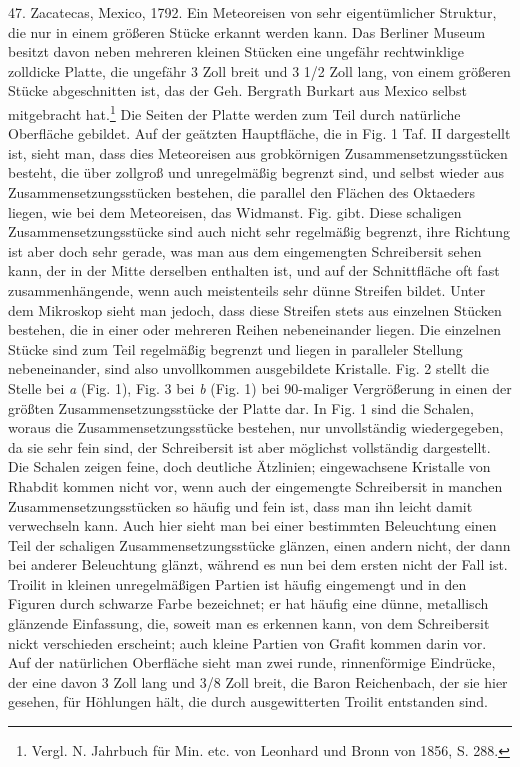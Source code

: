 \documentclass[a4paper, 11pt, oneside]{article}
\begin{document}
47. Zacatecas, Mexico, 1792. Ein Meteoreisen von sehr eigentümlicher Struktur, die nur in einem größeren Stücke erkannt werden kann. Das Berliner Museum besitzt davon neben mehreren kleinen Stücken eine ungefähr rechtwinklige zolldicke Platte, die ungefähr 3 Zoll breit und 3 1/2 Zoll lang, von einem größeren Stücke abgeschnitten ist, das der Geh. Bergrath Burkart aus Mexico selbst mitgebracht hat.\footnote{Vergl. N. Jahrbuch für Min. etc. von Leonhard und Bronn von 1856, S. 288.} Die Seiten der Platte werden zum Teil durch natürliche Oberfläche gebildet. Auf der geätzten Hauptfläche, die in Fig. 1 Taf. II dargestellt ist, sieht man, dass dies Meteoreisen aus grobkörnigen Zusammensetzungsstücken besteht, die über zollgroß und unregelmäßig begrenzt sind, und selbst wieder aus Zusammensetzungsstücken bestehen, die parallel den Flächen des Oktaeders liegen, wie bei dem Meteoreisen, das Widmanst. Fig. gibt. Diese schaligen Zusammensetzungsstücke sind auch nicht sehr regelmäßig begrenzt, ihre Richtung ist aber doch sehr gerade, was man aus dem eingemengten Schreibersit sehen kann, der in der Mitte derselben enthalten ist, und auf der Schnittfläche oft fast zusammenhängende, wenn auch meistenteils sehr dünne Streifen bildet. Unter dem Mikroskop sieht man jedoch, dass diese Streifen stets aus einzelnen Stücken bestehen, die in einer oder mehreren Reihen nebeneinander liegen. Die einzelnen Stücke sind zum Teil regelmäßig begrenzt und liegen in paralleler Stellung nebeneinander, sind also unvollkommen ausgebildete Kristalle. Fig. 2 stellt die Stelle bei \emph{a} (Fig. 1), Fig. 3 bei \emph{b} (Fig. 1) bei 90-maliger Vergrößerung in einen der größten Zusammensetzungsstücke der Platte dar. In Fig. 1 sind die Schalen, woraus die Zusammensetzungsstücke bestehen, nur unvollständig wiedergegeben, da sie sehr fein sind, der Schreibersit ist aber möglichst vollständig dargestellt. Die Schalen zeigen feine, doch deutliche Ätzlinien; eingewachsene Kristalle von Rhabdit kommen nicht vor, wenn auch der eingemengte Schreibersit in manchen Zusammensetzungsstücken so häufig und fein ist, dass man ihn leicht damit verwechseln kann. Auch hier sieht man bei einer bestimmten Beleuchtung einen Teil der schaligen Zusammensetzungsstücke glänzen, einen andern nicht, der dann bei anderer Beleuchtung glänzt, während es nun bei dem ersten nicht der Fall ist. Troilit in kleinen unregelmäßigen Partien ist häufig eingemengt und in den Figuren durch schwarze Farbe bezeichnet; er hat häufig eine dünne, metallisch glänzende Einfassung, die, soweit man es erkennen kann, von dem Schreibersit nickt verschieden erscheint; auch kleine Partien von Grafit kommen darin vor. Auf der natürlichen Oberfläche sieht man zwei runde, rinnenförmige Eindrücke, der eine davon 3 Zoll lang und 3/8 Zoll breit, die Baron Reichenbach, der sie hier gesehen, für Höhlungen hält, die durch ausgewitterten Troilit entstanden sind.
\end{document}
